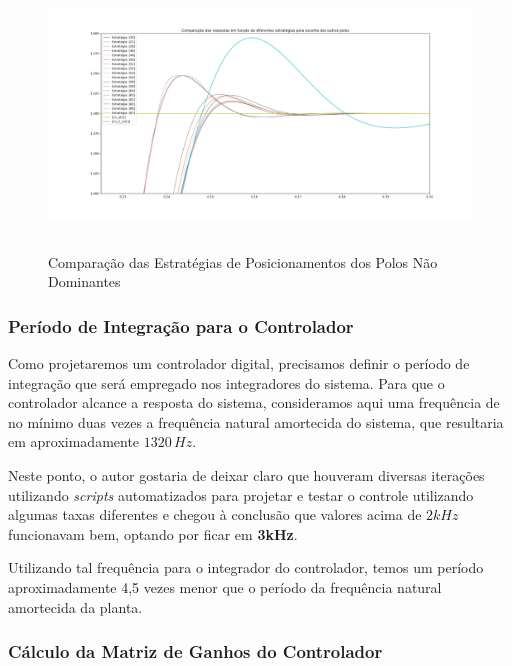 \documentclass[
	12pt,				%
	article,			%
	openright,			%
	oneside,
	a4paper,			%
	chapter=TITLE,		%
	section=TITLE,		%
	english,			%
	french,				%
	spanish,			%
	brazil,				%
]{abntex2}
\begin{document}
            \begin{figure}[htbp]
            	\centering
            	\caption{Comparação das Estratégias de Posicionamentos dos Polos Não Dominantes}
            	\includegraphics[width=\textwidth,height=240px,keepaspectratio]{imgs/strategies_comparison.png}
            	\label{fig-strategies_comparison}
        	\end{figure}
            
            \subsubsection{Período de Integração para o Controlador}
            
                Como projetaremos um controlador digital, precisamos definir o período de integração que será empregado nos integradores do sistema. Para que o controlador alcance a resposta do sistema, consideramos aqui uma frequência de no mínimo duas vezes a frequência natural amortecida do sistema, que resultaria em aproximadamente $1320\,Hz$. 
                
                Neste ponto, o autor gostaria de deixar claro que houveram diversas iterações utilizando \textit{scripts} automatizados para projetar e testar o controle utilizando algumas taxas diferentes e chegou à conclusão que valores acima de $2kHz$ funcionavam bem, optando por ficar em \textbf{3kHz}. 
                
                Utilizando tal frequência para o integrador do controlador, temos um período aproximadamente 4,5 vezes menor que o período da frequência natural amortecida da planta.
                
            \subsubsection{Cálculo da Matriz de Ganhos do Controlador}
            
\end{document}
